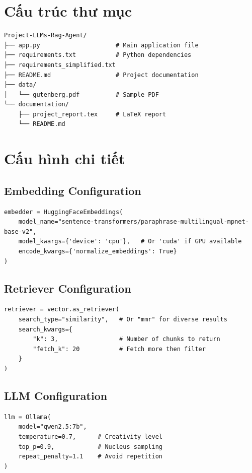 \documentclass[12pt,a4paper]{report}
\begin{document}
\section{Cấu trúc thư mục}
\begin{lstlisting}
Project-LLMs-Rag-Agent/
├── app.py                     # Main application file
├── requirements.txt           # Python dependencies
├── requirements_simplified.txt
├── README.md                  # Project documentation
├── data/
│   └── gutenberg.pdf          # Sample PDF
└── documentation/
    ├── project_report.tex     # LaTeX report
    └── README.md
\end{lstlisting}

\section{Cấu hình chi tiết}

\subsection{Embedding Configuration}
\begin{lstlisting}
embedder = HuggingFaceEmbeddings(
    model_name="sentence-transformers/paraphrase-multilingual-mpnet-base-v2",
    model_kwargs={'device': 'cpu'},   # Or 'cuda' if GPU available
    encode_kwargs={'normalize_embeddings': True}
)
\end{lstlisting}

\subsection{Retriever Configuration}
\begin{lstlisting}
retriever = vector.as_retriever(
    search_type="similarity",   # Or "mmr" for diverse results
    search_kwargs={
        "k": 3,                 # Number of chunks to return
        "fetch_k": 20           # Fetch more then filter
    }
)
\end{lstlisting}

\subsection{LLM Configuration}
\begin{lstlisting}
llm = Ollama(
    model="qwen2.5:7b",
    temperature=0.7,      # Creativity level
    top_p=0.9,            # Nucleus sampling
    repeat_penalty=1.1    # Avoid repetition
)
\end{lstlisting}
\end{document}
